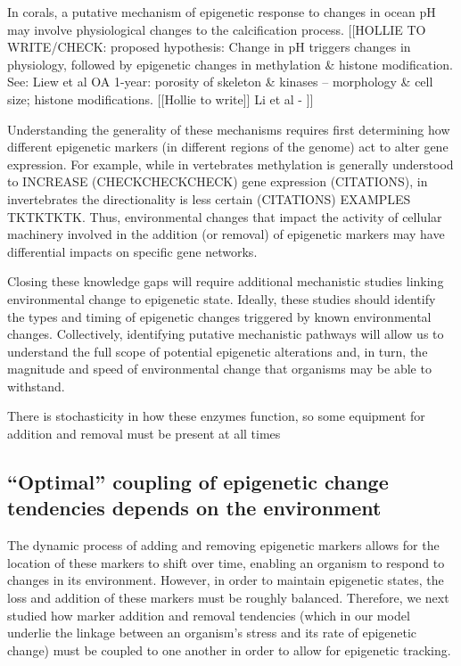 \documentclass{article}
\begin{document}
In corals, a putative mechanism of epigenetic response to changes in ocean pH may involve physiological changes to the calcification process. [[HOLLIE TO WRITE/CHECK: proposed hypothesis: Change in pH triggers changes in physiology, followed by epigenetic changes in methylation \& histone modification. See: Liew et al OA 1-year: porosity of skeleton \& kinases – morphology \& cell size; histone modifications. [[Hollie to write]] Li et al  - ]]

Understanding the generality of these mechanisms requires first determining how different epigenetic markers (in different regions of the genome) act to alter gene expression. For example, while in vertebrates methylation is generally understood to INCREASE (CHECKCHECKCHECK) gene expression (CITATIONS), in invertebrates the directionality is less certain (CITATIONS) EXAMPLES TKTKTKTK. Thus, environmental changes that impact the activity of cellular machinery involved in the addition (or removal) of epigenetic markers may have differential impacts on specific gene networks.

Closing these knowledge gaps will require additional mechanistic studies linking environmental change to epigenetic state. Ideally, these studies should identify the types and timing of epigenetic changes triggered by known environmental changes. Collectively, identifying putative mechanistic pathways will allow us to understand the full scope of potential epigenetic alterations and, in turn, the magnitude and speed of environmental change that organisms may be able to withstand.

There is stochasticity in how these enzymes function, so some equipment for addition and removal must be present at all times

\clearpage

\subsection{``Optimal'' coupling of epigenetic change tendencies depends on the environment}

The dynamic process of adding and removing epigenetic markers allows for the location of these markers to shift over time, enabling an organism to respond to changes in its environment. However, in order to maintain epigenetic states, the loss and addition of these markers must be roughly balanced. Therefore, we next studied how marker addition and removal tendencies (which in our model underlie the linkage between an organism's stress and its rate of epigenetic change) must be coupled to one another in order to allow for epigenetic tracking.
\end{document}
